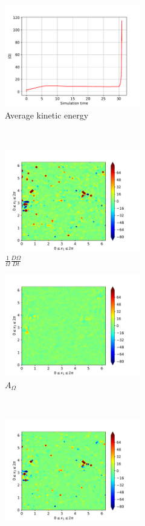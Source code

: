 \begin{figure}[H]
    \begin{subfigure}[H]{0.45\textwidth}
        \includegraphics[height=1.75in]{media/run-cds-65/enst-average1460}
        \caption{Average kinetic energy}
    \end{subfigure}
    ~
    \begin{subfigure}[H]{0.45\textwidth}
        \includegraphics[height=1.75in]{media/run-cds-65/enst-1460}
        \caption{$\frac{1}{\Omega} \frac{D \Omega}{Dt}$}
    \end{subfigure}
    \newline
    \begin{subfigure}{0.45\textwidth}
        \includegraphics[height=1.75in]{media/run-cds-65/A-enst-1460}
        \caption{$A_{\Omega}$}
    \end{subfigure}
    ~
    \begin{subfigure}{0.45\textwidth}
        \includegraphics[height=1.75in]{media/run-cds-65/Pi-enst-1460}

\end{subfigure}
\end{figure}
